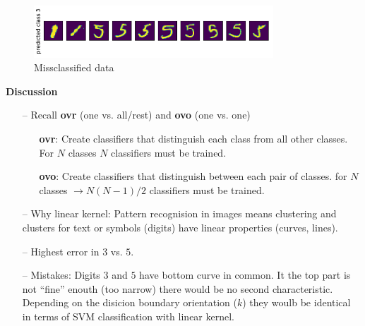 \documentclass[12pt,a4paper]{article}
\begin{document}
\begin{enumerate}[a)]
\begin{figure}[H]
	\centering
  \includegraphics[width=0.8\textwidth]{figures/svm3_b_mc.png}
	\caption{Missclassified data}
	\label{svm3_b_mc}
\end{figure}

\textbf{Discussion}

\begin{itemize}
  \item[--] Recall \textbf{ovr} (one vs. all/rest) and \textbf{ovo} (one vs.
  one)
    \begin{itemize}
	  \item[\textbullet] \textbf{ovr}: Create classifiers that distinguish each
	  class from all other classes\autocite{lecuter_notes_ci}. For $\mathit{N}$ classes
	  $\mathit{N} $ classifiers must be trained.
	  \item[\textbullet] \textbf{ovo}: Create classifiers that distinguish between
	  each pair of classes\autocite{lecuter_notes_ci}. for $\mathit{N}$ classes
	  $\rightarrow \mathit{N}(\mathit{N} - 1) / 2$ classifiers must be trained.
	\end{itemize}
  \item[--] Why linear kernel: Pattern recognision in images means clustering
  and clusters for text or symbols (digits) have linear properties (curves,
  lines).
  \item[--] Highest error in $3$ vs. $5$.
  \item[--] Mistakes: Digits $3$ and $5$ have bottom curve in common. It the top
  part is not ``fine'' enouth (too narrow) there would be no second
  characteristic. Depending on the disicion boundary orientation ($k$) they
  woulb be identical in terms of SVM classification with linear kernel.
\end{itemize}

\end{enumerate}

\newpage
\printbibliography
\end{document}
